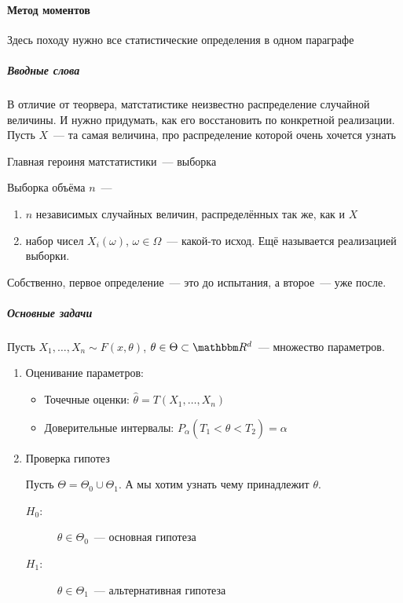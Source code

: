 \documentclass[12pt,timbord]{../../../notes}
\begin{document}
\paragraph{Метод моментов}
\label{par:stat::mom}

Здесь походу нужно все статистические определения в одном параграфе \flame

\subparagraph{Вводные слова}
В отличие от теорвера, матстатистике неизвестно распределение случайной величины. И нужно
придумать, как его восстановить по конкретной реализации. Пусть $X$~--- та самая величина,
про распределение которой очень хочется узнать

Главная героиня матстатистики~--- выборка
\begin{defn}\label{defn:stat::mom::chosen}
  Выборка объёма $n$~--- 
  \begin{enumerate}
    \item $n$ независимых случайных величин, распределённых так же, как и $X$
    \item набор чисел $X_i(\omega)$, $\omega \in \Omega$~--- какой-то исход. Ещё называется
      реализацией выборки.
  \end{enumerate}
  Собственно, первое определение~--- это до испытания, а второе~--- уже после.
\end{defn}

\subparagraph{Основные задачи}
Пусть $X_1, \dotsc, X_n \sim F(x,\theta)$, $\theta \in \Theta \subset \R^d$~--- множество
параметров.

\begin{enumerate}
  \item Оценивание параметров:
    \begin{itemize}
      \item Точечные оценки: $\hat\theta = T(X_1, \dotsc, X_n)$
      \item Доверительные интервалы: $P_\alpha (T_1 < \hat\theta < T_2) = \alpha$
    \end{itemize}
  \item Проверка гипотез\par
    Пусть $\Theta = \Theta_0 \cup \Theta_1$. А мы хотим узнать чему принадлежит $\theta$. 
    \begin{description}
      \item[$H_0$:] $\theta\in \Theta_0$~--- основная гипотеза 
      \item[$H_1$:] $\theta\in \Theta_1$~--- альтернативная гипотеза 
    \end{description}
\end{enumerate}
\end{document}
